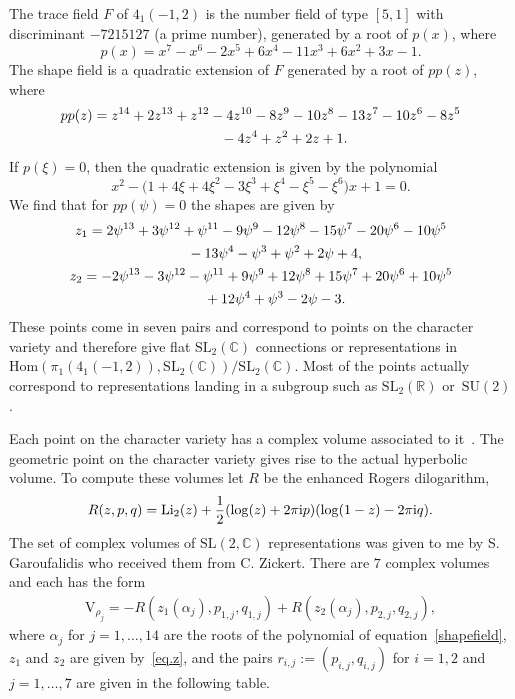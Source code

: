 \documentclass[pdftex]{sigma}
\numberwithin{equation}{section}
\def\BR{\mathbb{R}}
\def\BC{\mathbb{C}}
\def\SL{\mathrm{SL}}
\def\be{\begin{equation}}
\def\ee{\end{equation}}
\def\Li{\mathrm{Li}}
\def\VC{\mathrm{VC}}
\def\SL{\mathrm{SL}}
\def\BR{\mathbb R}
\def\BC{\mathbb C}
\def\SL{\mathrm{SL}}
\def\Li{\operatorname{Li}}
\def\be{\begin{equation}}
\def\ee{\end{equation}}
\def\VC{\mathrm{V}}
\begin{document}
The trace field $F$ of $4_1(-1,2)$ is the number field of type $[5,1]$ with discriminant $-7215127$ (a prime number),
generated by a root of $p(x)$, where
\be
\label{tracefield}
p(x) =x^7 - x^6 - 2 x^5 + 6 x^4 - 11 x^3 + 6 x^2 + 3 x - 1  .
\ee
The shape field is a quadratic extension of $F$ generated by a root of $pp(z)$, where
\begin{gather}
pp(z) =z^{14} + 2 z^{13} + z^{12} - 4 z^{10} - 8 z^9 - 10 z^8 - 13 z^7 -
10 z^6 - 8 z^5 \nonumber\\ \hphantom{pp(z) =}{}
 - 4 z^4 + z^2 + 2 z + 1 .\label{shapefield}
\end{gather}
If $p(\xi)=0$, then the quadratic extension is given by the polynomial
\[
x^2-\bigl(1+4\xi+4\xi^2-3\xi^3+\xi^4-\xi^5-\xi^6\bigr)x+1 =0  .
\]
We find that for $pp(\psi)=0$ the shapes are given by
\begin{gather}
z_1  = 2 \psi^{13} + 3 \psi^{12} + \psi^{11} - 9 \psi^9
- 12 \psi^8 - 15 \psi^7 - 20 \psi^6 - 10 \psi^5 \nonumber\\
\hphantom{z_1  =}{}
- 13 \psi^4 - \psi^3 + \psi^2 + 2 \psi + 4 ,\nonumber \\
z_2  = -2 \psi^{13} - 3 \psi^{12} - \psi^{11} + 9 \psi^9
+ 12 \psi^8 + 15 \psi^7 + 20 \psi^6 + 10 \psi^5 \nonumber\\
\hphantom{z_2  =}{}
+ 12 \psi^4 + \psi^3 - 2 \psi - 3.\label{eq.z}
\end{gather}
These points come in seven pairs and correspond to points on the character variety and therefore give flat $\SL_{2}(\BC)$ connections or representations in $\mathrm{Hom}(\pi_{1}(4_1(-1,2)),\SL_{2}(\BC))/\SL_{2}(\BC)$. Most of the points actually correspond to representations landing in a subgroup such as $\SL_{2}(\BR)$ or~$\mathrm{SU}(2)$.

Each point on the character variety has a complex volume associated to it~\cite{Neu:Ext}. The geometric point on the character variety gives rise to the actual hyperbolic volume. To compute these volumes let $R$ be the enhanced Rogers dilogarithm,
\[
R(z, p, q)  = \Li_2(z)
+ \frac{1}{2}(\log(z) + 2 \pi {\rm i} p) (\log(1 - z) - 2 \pi {\rm i} q)  .
\]
The set of complex volumes of $\SL(2,\BC)$ representations was given to me by S. Garoufalidis who received them from C. Zickert.
There are $7$ complex volumes and each has the form
\begin{gather*}
\VC_{\rho_j}  = - R(z_1(\alpha_j),p_{1,j},q_{1,j})
+ R(z_2(\alpha_j),p_{2,j},q_{2,j}),
\end{gather*}
where $\alpha_j$ for $j=1,\dots,14$ are the roots of the polynomial of
equation~\eqref{shapefield},
$z_1$ and $z_2$ are given by~\eqref{eq.z}, and
the pairs $r_{i,j}:=(p_{i,j},q_{i,j})$ for $i=1,2$ and $j=1,\dots,7$
are given in the following table.
\end{document}
